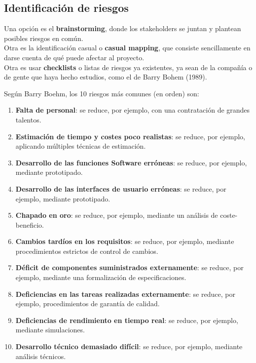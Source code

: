 \documentclass[12pt]{article}
\begin{document}
\subsection{Identificación de riesgos}
\label{7.5.0}

{Una opción es el \textbf{brainstorming}, donde los stakeholders se juntan y plantean posibles riesgos en común.} \\

{Otra es la identificación casual o \textbf{casual mapping}, que consiste sencillamente en darse cuenta de qué puede afectar al proyecto.} \\

{Otra es usar \textbf{checklists} o listas de riesgos ya existentes, ya sean de la compañía o de gente que haya hecho estudios, como el de Barry Bohem (1989).}

{Según Barry Boehm, los 10 riesgos más comunes (en orden) son:}

\begin{enumerate}
    \item {\textbf{Falta de personal}: se reduce, por ejemplo, con una contratación de grandes talentos.}
    \item {\textbf{Estimación de tiempo y costes poco realistas}: se reduce, por ejemplo, aplicando múltiples técnicas de estimación.}
    \item {\textbf{Desarrollo de las funciones Software erróneas}: se reduce, por ejemplo, mediante prototipado.}
    \item {\textbf{Desarrollo de las interfaces de usuario erróneas}: se reduce, por ejemplo, mediante prototipado.}
    \item {\textbf{Chapado en oro}: se reduce, por ejemplo, mediante un análisis de coste-beneficio.}
    \item {\textbf{Cambios tardíos en los requisitos}: se reduce, por ejemplo, mediante procedimientos estrictos de control de cambios.}
    \item {\textbf{Déficit de componentes suministrados externamente}: se reduce, por ejemplo, mediante una formalización de especificaciones.}
    \item {\textbf{Deficiencias en las tareas realizadas externamente}: se reduce, por ejemplo, procedimientos de garantía de calidad.}
    \item {\textbf{Deficiencias de rendimiento en tiempo real}: se reduce, por ejemplo, mediante simulaciones.}
    \item {\textbf{Desarrollo técnico demasiado difícil}: se reduce, por ejemplo, mediante análisis técnicos.}
\end{enumerate}
\end{document}
